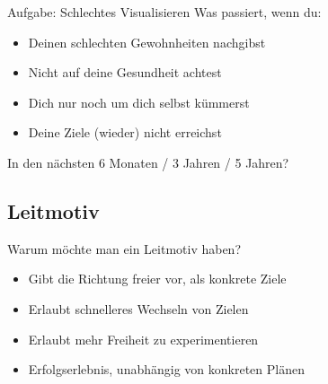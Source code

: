 \begin{frame}[c]
    \begin{block}{Aufgabe: Schlechtes Visualisieren}
    Was passiert, wenn du:
    \begin{itemize}
        \item Deinen schlechten Gewohnheiten nachgibst
        \item Nicht auf deine Gesundheit achtest
        \item Dich nur noch um dich selbst kümmerst
        \item Deine Ziele (wieder) nicht erreichst
    \end{itemize}
    \pause
    In den nächsten 6 Monaten / 3 Jahren / 5 Jahren?
    \end{block}
\end{frame}






\subsection{Leitmotiv}

\begin{frame}[c]{Warum möchte man ein Leitmotiv haben?}
    \large
    \begin{itemize}
        \item Gibt die Richtung freier vor, als konkrete Ziele
        \item Erlaubt schnelleres Wechseln von Zielen
        \item Erlaubt mehr Freiheit zu experimentieren
        \item Erfolgserlebnis, unabhängig von konkreten Plänen
    \end{itemize}
\end{frame}


